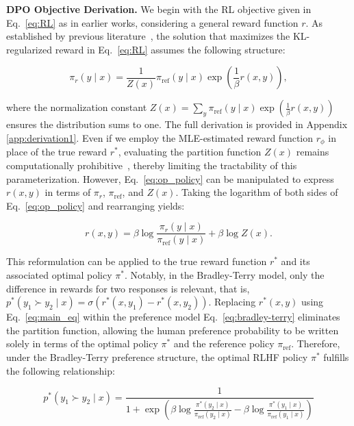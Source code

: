 \textbf{DPO Objective Derivation.} We begin with the RL objective given in Eq.~\ref{eq:RL} as in earlier works, considering a general reward function $r$. As established by previous literature~\citep{peters2007reinforcement, peng2019advantage, korbak2022reinforcement, go2023aligning}, the solution that maximizes the KL-regularized reward in Eq.~\ref{eq:RL} assumes the following structure:

\begin{equation}\label{eq:op_policy}
    \pi_r(y\mid x) = \frac{1}{Z(x)}\pi_\text{ref}(y\mid x)\exp\left(\frac{1}{\beta}r(x, y)\right),
\end{equation}

where the normalization constant $Z(x) =\sum_{y}\pi_\text{ref}(y\mid x)\exp\left(\frac{1}{\beta}r(x, y)\right)$ ensures the distribution sums to one. The full derivation is provided in Appendix \ref{app:derivation1}. Even if we employ the MLE-estimated reward function $r_\phi$ in place of the true reward $r^*$, evaluating the partition function $Z(x)$ remains computationally prohibitive~\citep{korbak2022reinforcement, go2023aligning}, thereby limiting the tractability of this parameterization. However, Eq.~\ref{eq:op_policy} can be manipulated to express $r(x, y)$ in terms of $\pi_r$, $\pi_\text{ref}$, and $Z(x)$. Taking the logarithm of both sides of Eq.~\ref{eq:op_policy} and rearranging yields:

\begin{equation}\label{eq:main_eq}
    r(x,y) =\beta \log \frac{\pi_r(y\mid x)}{\pi_\text{ref}(y\mid x)} + \beta \log Z(x).
\end{equation}

This reformulation can be applied to the true reward function $r^*$ and its associated optimal policy $\pi^*$. Notably, in the Bradley-Terry model, only the difference in rewards for two responses is relevant, that is, ${p^*(y_1 \succ y_2 \mid x) = \sigma(r^*(x, y_1) - r^*(x, y_2))}$. Replacing $r^*(x,y)$ using Eq.~\ref{eq:main_eq} within the preference model Eq.~\ref{eq:bradley-terry} eliminates the partition function, allowing the human preference probability to be written solely in terms of the optimal policy $\pi^*$ and the reference policy $\pi_\text{ref}$. Therefore, under the Bradley-Terry preference structure, the optimal RLHF policy $\pi^*$ fulfills the following relationship:

\begin{equation}\label{eq:objective}
    p^*(y_1\succ y_2 \mid x)=\frac{1}{1 + \exp\left(\beta \log \frac{\pi^*(y_2\mid x)}{\pi_\text{ref}(y_2\mid x)} - \beta \log \frac{\pi^*(y_1\mid x)}{\pi_\text{ref}(y_1\mid x)}\right)}
\end{equation}

